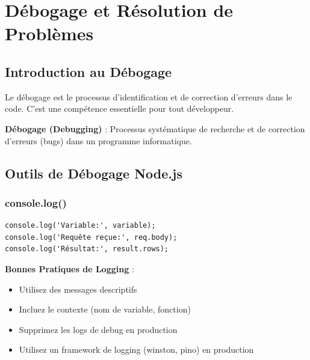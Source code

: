 \chapter{Débogage et Résolution de Problèmes}

\section{Introduction au Débogage}

Le débogage est le processus d'identification et de correction d'erreurs dans le code. C'est une compétence essentielle pour tout développeur.

\begin{definitionbox}
    \textbf{Débogage (Debugging)} : Processus systématique de recherche et de correction d'erreurs (bugs) dans un programme informatique.
\end{definitionbox}

\section{Outils de Débogage Node.js}

\subsection{console.log()}

\begin{lstlisting}[style=javascript, caption=Utilisation de console.log()]
console.log('Variable:', variable);
console.log('Requête reçue:', req.body);
console.log('Résultat:', result.rows);
\end{lstlisting}

\begin{bestpracticebox}
    \textbf{Bonnes Pratiques de Logging} :
    \begin{itemize}
        \item Utilisez des messages descriptifs
        \item Incluez le contexte (nom de variable, fonction)
        \item Supprimez les logs de debug en production
        \item Utilisez un framework de logging (winston, pino) en production
    \end{itemize}
\end{bestpracticebox}

